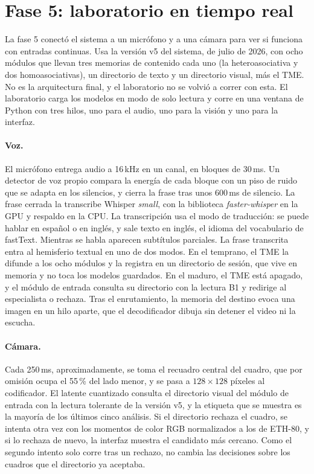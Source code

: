 \section{Fase 5: laboratorio en tiempo real}
\label{fase5:laboratorio}

La fase 5 conectó el sistema a un micrófono y a una cámara para ver si funciona con
entradas continuas.
Usa la versión v5 del sistema, de julio de 2026, con ocho módulos que llevan tres
memorias de contenido cada uno (la heteroasociativa y dos homoasociativas), un
directorio de texto y un directorio visual, más el TME.
No es la arquitectura final, y el laboratorio no se volvió a correr con esta.
El laboratorio carga los modelos en modo de solo lectura y corre en una ventana de
Python con tres hilos, uno para el audio, uno para la visión y uno para la interfaz.

\paragraph{Voz.}
El micrófono entrega audio a 16\,kHz en un canal, en bloques de 30\,ms.
Un detector de voz propio compara la energía de cada bloque con un piso de ruido que se
adapta en los silencios, y cierra la frase tras unos 600\,ms de silencio.
La frase cerrada la transcribe Whisper \textit{small}, con la biblioteca
\textit{faster-whisper} en la GPU y respaldo en la CPU.
La transcripción usa el modo de traducción: se puede hablar en español o en inglés, y
sale texto en inglés, el idioma del vocabulario de fastText.
Mientras se habla aparecen subtítulos parciales.
La frase transcrita entra al hemisferio textual en uno de dos modos.
En el temprano, el TME la difunde a los ocho módulos y la registra en un directorio de
sesión, que vive en memoria y no toca los modelos guardados.
En el maduro, el TME está apagado, y el módulo de entrada consulta su directorio con la
lectura B1 y redirige al especialista o rechaza.
Tras el enrutamiento, la memoria del destino evoca una imagen en un hilo aparte, que el
decodificador dibuja sin detener el video ni la escucha.

\paragraph{Cámara.}
Cada 250\,ms, aproximadamente, se toma el recuadro central del cuadro, que por omisión
ocupa el 55\,\% del lado menor, y se pasa a $128 \times 128$ píxeles al codificador.
El latente cuantizado consulta el directorio visual del módulo de entrada con la lectura
tolerante de la versión v5, y la etiqueta que se muestra es la mayoría de los últimos
cinco análisis.
Si el directorio rechaza el cuadro, se intenta otra vez con los momentos de color RGB
normalizados a los de ETH-80, y si lo rechaza de nuevo, la interfaz muestra el candidato
más cercano.
Como el segundo intento solo corre tras un rechazo, no cambia las decisiones sobre los
cuadros que el directorio ya aceptaba.

